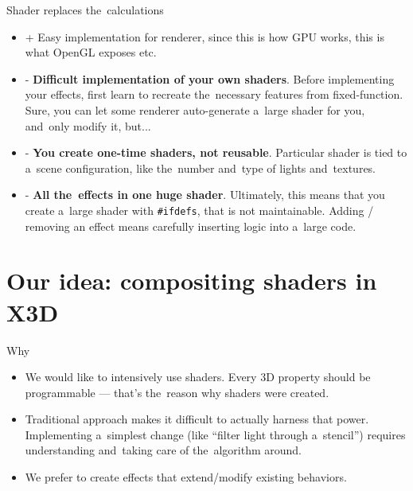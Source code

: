 \documentclass{beamer}
\begin{document}
\begin{frame}{Shader replaces the~calculations}

\begin{itemize}
  \item + Easy implementation for renderer, since this is how GPU works,
    this is what OpenGL exposes etc.
  \item - \textbf{Difficult implementation of your own shaders}.
    Before implementing your effects, first learn to recreate
    the~necessary features from fixed-function.
    Sure, you can let some renderer auto-generate a~large shader for you,
    and~only modify it, but...
  \item - \textbf{You create one-time shaders, not reusable}.
    Particular shader is tied to a~scene configuration,
    like the~number and~type of lights and~textures.
  \item - \textbf{All the~effects in one huge shader}.
    Ultimately, this means that you create a~large shader with \texttt{\#ifdefs},
    that is not maintainable. Adding / removing an effect means carefully
    inserting logic into a~large code.
\end{itemize}
\end{frame}

\section[Our idea]{Our idea: compositing shaders in X3D}

\begin{frame}{Why}
\begin{itemize}
  \item We would like to intensively use shaders. Every 3D property
    should be programmable --- that's the~reason why shaders were created.

  \item Traditional approach
    makes it difficult to actually harness that power.
    Implementing a~simplest change (like ``filter light through a~stencil'')
    requires understanding and~taking care of the~algorithm around.

  \item We prefer to create effects that extend/modify existing behaviors.
\end{itemize}
\end{frame}
\end{document}
